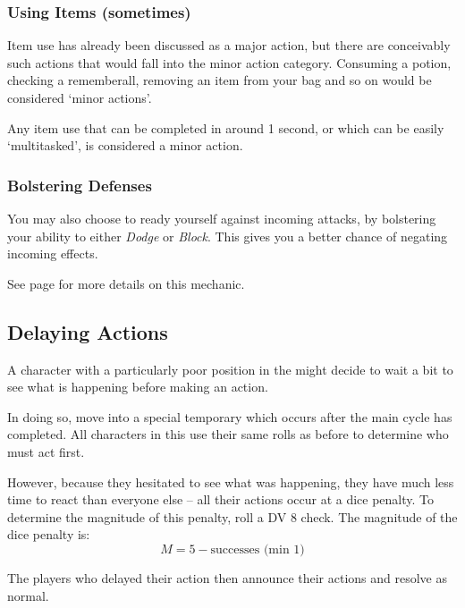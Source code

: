 \subsubsection{Using Items (sometimes)}

Item use has already been discussed as a major action, but there are conceivably such actions that would fall into the minor action category. Consuming a potion, checking a rememberall, removing an item from your bag and so on would be considered `minor actions'. 

Any item use that can be completed in around 1 second, or which can be easily `multitasked', is considered a minor action. 

\subsubsection{Bolstering Defenses}
 
 You may also choose to ready yourself against incoming attacks, by bolstering your ability to either {\it Dodge} or {\it Block}. This gives you a better chance of negating incoming effects.  

See page \pageref{S:Accuracy} for more details on this mechanic. 





\subsection{Delaying Actions}

A character with a particularly poor position in the  might decide to wait a bit to see what is happening before making an action. 

In doing so, move into a special temporary  which occurs after the main cycle has completed. All characters in this  use their same rolls as before to determine who must act first.

However, because they hesitated to see what was happening, they have much less time to react than everyone else -- all their actions occur at a dice penalty. To determine the magnitude of this penalty, roll a DV 8  check. The magnitude of the dice penalty is:
$$ M = 5 - \text{successes   (min 1)} $$

The players who delayed their action then announce their actions and resolve as normal. 


